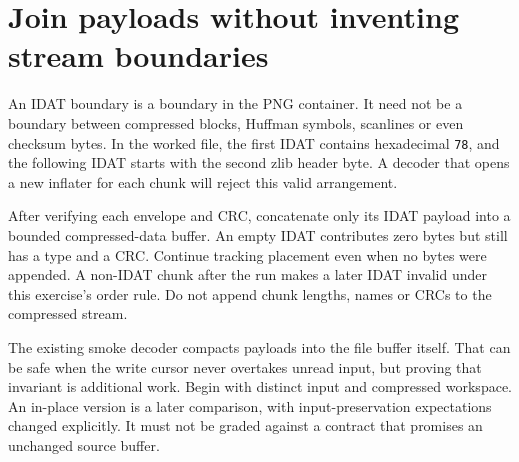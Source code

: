 \section{Join payloads without inventing stream boundaries}
An IDAT boundary is a boundary in the PNG container. It need not be a boundary between
compressed blocks, Huffman symbols, scanlines or even checksum bytes. In the worked
file, the first IDAT contains hexadecimal \texttt{78}, and the following IDAT starts
with the second zlib header byte. A decoder that opens a new inflater for each chunk
will reject this valid arrangement.

After verifying each envelope and CRC, concatenate only its IDAT payload into a
bounded compressed-data buffer. An empty IDAT contributes zero bytes but still has a
type and a CRC. Continue tracking placement even when no bytes were appended. A
non-IDAT chunk after the run makes a later IDAT invalid under this exercise's order
rule. Do not append chunk lengths, names or CRCs to the compressed stream.

The existing smoke decoder compacts payloads into the file buffer itself. That can
be safe when the write cursor never overtakes unread input, but proving that invariant
is additional work. Begin with distinct input and compressed workspace. An in-place
version is a later comparison, with input-preservation expectations changed explicitly.
It must not be graded against a contract that promises an unchanged source buffer.
